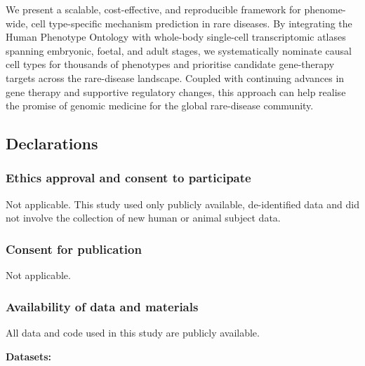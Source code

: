 \documentclass[
]{article}
\begin{document}
We present a scalable, cost-effective, and reproducible framework for
phenome-wide, cell type-specific mechanism prediction in rare diseases.
By integrating the Human Phenotype Ontology with whole-body single-cell
transcriptomic atlases spanning embryonic, foetal, and adult stages, we
systematically nominate causal cell types for thousands of phenotypes
and prioritise candidate gene-therapy targets across the rare-disease
landscape. Coupled with continuing advances in gene therapy and
supportive regulatory changes, this approach can help realise the
promise of genomic medicine for the global rare-disease community.

\subsection{Declarations}\label{declarations}

\subsubsection{Ethics approval and consent to
participate}\label{ethics-approval-and-consent-to-participate}

Not applicable. This study used only publicly available, de-identified
data and did not involve the collection of new human or animal subject
data.

\subsubsection{Consent for publication}\label{consent-for-publication}

Not applicable.

\subsubsection{Availability of data and
materials}\label{availability-of-data-and-materials}

All data and code used in this study are publicly available.

\textbf{Datasets:}
\end{document}
